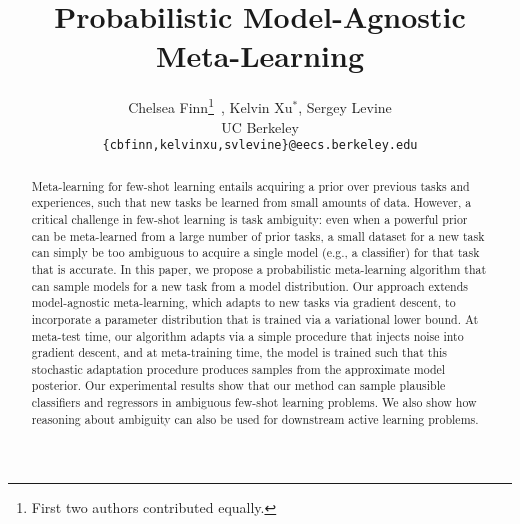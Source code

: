 \documentclass{article}
\title{Probabilistic Model-Agnostic Meta-Learning}
\author{
  Chelsea Finn\thanks{First two authors contributed equally.}~, Kelvin Xu$^*$\!, Sergey Levine \\
  UC Berkeley\\
  \texttt{\{cbfinn,kelvinxu,svlevine\}@eecs.berkeley.edu} \\
}
\begin{document}
\maketitle

\begin{abstract}
Meta-learning for few-shot learning entails acquiring a prior over previous tasks and experiences, such that new tasks be learned from small amounts of data. However, a critical challenge in few-shot learning is task ambiguity: even when a powerful prior can be meta-learned from a large number of prior tasks, a small dataset for a new task can simply be too ambiguous to acquire a single model (e.g., a classifier) for that task that is accurate. In this paper, we propose a probabilistic meta-learning algorithm that can sample models for a new task from a model distribution. Our approach extends model-agnostic meta-learning, which adapts to new tasks via gradient descent, to incorporate a parameter distribution that is trained via a variational lower bound. At meta-test time, our algorithm adapts via a simple procedure that injects noise into gradient descent, and at meta-training time, the model is trained such that this stochastic adaptation procedure produces samples from the approximate model posterior. Our experimental results show that our method can sample plausible classifiers and regressors in ambiguous few-shot learning problems. We also show how reasoning about ambiguity can also be used for downstream active learning problems.
\end{abstract}

\newcommand{\cmt}[1]{{\footnotesize\textcolor{red}{#1}}}
\newcommand{\note}[1]{\cmt{Note: #1}}
\newcommand{\todo}[1]{\cmt{TO-DO: #1}}
\newcommand{\sergey}[1]{\cmt{Sergey: #1}}
\newcommand{\chelsea}[1]{\cmt{Chelsea: #1}}
\newcommand{\kelvin}[1]{\cmt{Kelvin: #1}}
\newcommand{\review}[1]{\noindent\textcolor{red}{$\rightarrow$ #1}}
\newcommand{\response}[1]{\noindent{#1}}

\newcommand{\diff}[1]{\textcolor{red}{#1}}

\long{}

\newcommand{\data}{\mathcal{D}}
\newcommand{\task}{\mathcal{T}}

\newcommand{\etal}{{et~al.}\ }
\newcommand{\eg}{e.g.\ }
\newcommand{\ie}{i.e.\ }
\newcommand{\nth}{\text{th}}
\newcommand{\pr}{^\prime}
\newcommand{\tr}{^\mathrm{T}}
\newcommand{\inv}{^{-1}}
\newcommand{\pinv}{^{\dagger}}
\newcommand{\real}{\mathbb{R}}
\newcommand{\gauss}{\mathcal{N}}
\newcommand{\norm}[1]{\left|#1\right|}
\newcommand{\trace}{\text{tr}}
\newcommand{\expectation}[2]{\mathbb{E}_{#1}\left[ #2 \right]}
\end{document}
